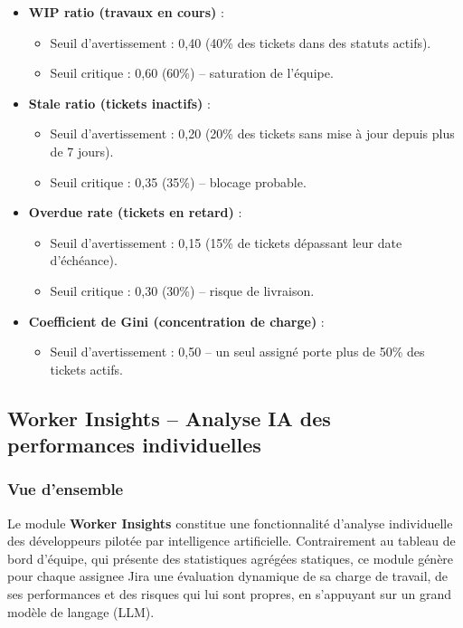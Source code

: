 \begin{itemize}
    \renewcommand{\labelitemi}{—}
    \item \textbf{WIP ratio (travaux en cours)} :
        \begin{itemize}
            \item Seuil d’avertissement : 0,40 (40\% des tickets dans des statuts actifs).
            \item Seuil critique : 0,60 (60\%) – saturation de l’équipe.
        \end{itemize}
    \item \textbf{Stale ratio (tickets inactifs)} :
        \begin{itemize}
            \item Seuil d’avertissement : 0,20 (20\% des tickets sans mise à jour depuis plus de 7 jours).
            \item Seuil critique : 0,35 (35\%) – blocage probable.
        \end{itemize}
    \item \textbf{Overdue rate (tickets en retard)} :
        \begin{itemize}
            \item Seuil d’avertissement : 0,15 (15\% de tickets dépassant leur date d’échéance).
            \item Seuil critique : 0,30 (30\%) – risque de livraison.
        \end{itemize}
    \item \textbf{Coefficient de Gini (concentration de charge)} :
        \begin{itemize}
            \item Seuil d’avertissement : 0,50 – un seul assigné porte plus de 50\% des tickets actifs.
        \end{itemize}
\end{itemize}

\subsection{Worker Insights -- Analyse IA des performances individuelles}
\label{subsec:worker-insights}

\subsubsection*{Vue d'ensemble}

Le module \textbf{Worker Insights} constitue une fonctionnalité d'analyse individuelle des développeurs pilotée par intelligence artificielle. Contrairement au tableau de bord d'équipe, qui présente des statistiques agrégées statiques, ce module génère pour chaque assignee Jira une évaluation dynamique de sa charge de travail, de ses performances et des risques qui lui sont propres, en s'appuyant sur un grand modèle de langage (LLM).

